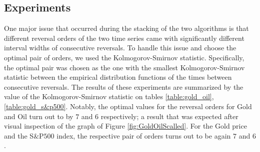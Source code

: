 \documentclass[a4, 11pt]{article}
\begin{document}
\subsection{Experiments}
One major issue that occurred during the stacking of the two algorithms is that different reversal orders of the two time series came with significantly different interval widths of consecutive reversals. To handle this issue and choose the optimal pair of orders, we used the Kolmogorov-Smirnov statistic. Specifically, the optimal pair was chosen as the one with the smallest Kolmogorov-Smirnov statistic between the empirical distribution functions of the times between consecutive reversals. The results of these experiments are summarized by the value of the Kolmogorov-Smirnov statistic on tables \ref{table:gold_oil}, \ref{table:gold_s&p500}. Notably, the optimal values for the reversal orders for Gold and Oil turn out to by $7$ and $6$ respectively; a result that was expected after visual inspection of the graph of Figure \ref{fig:GoldOilScalled}. For the Gold price and the S$\&$P$500$ index, the respective pair of orders turns out to be again $7$ and $6$. 
\end{document}
